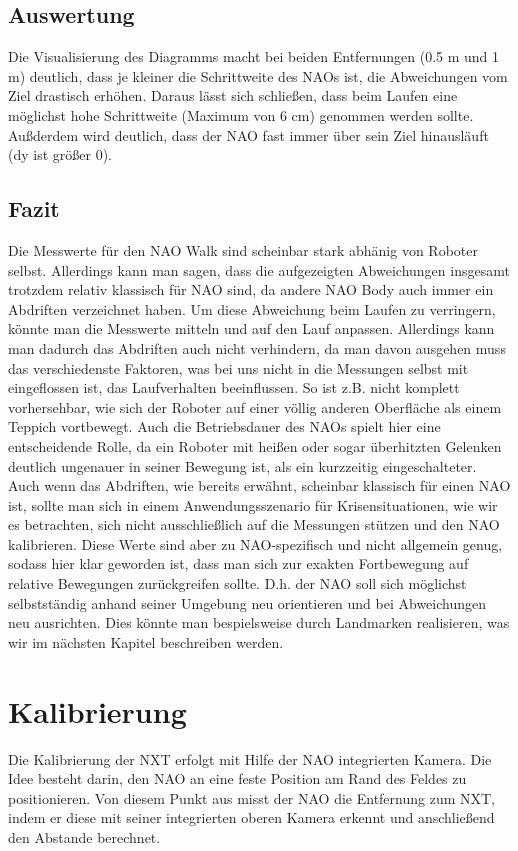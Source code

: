 \subsection{Auswertung}
Die Visualisierung des Diagramms macht bei beiden Entfernungen (0.5 m und 1 m) deutlich, dass je kleiner die Schrittweite des NAOs ist, die Abweichungen vom Ziel drastisch erhöhen. Daraus lässt sich schließen, dass beim Laufen eine möglichst hohe Schrittweite (Maximum von 6 cm) genommen werden sollte.
Außderdem wird deutlich, dass der NAO fast immer über sein Ziel hinausläuft (dy ist größer 0). 

\subsection{Fazit}
Die Messwerte für den NAO Walk sind scheinbar stark abhänig von Roboter selbst. Allerdings kann man sagen, dass die aufgezeigten Abweichungen insgesamt trotzdem relativ klassisch für NAO sind, da andere NAO Body auch immer ein Abdriften verzeichnet haben.
Um diese Abweichung beim Laufen zu verringern, könnte man die Messwerte mitteln und auf den Lauf anpassen. Allerdings kann man dadurch das Abdriften auch nicht verhindern, da man davon ausgehen muss das verschiedenste Faktoren, was bei uns nicht in die Messungen selbst mit eingeflossen ist, das Laufverhalten beeinflussen. So ist z.B. nicht komplett vorhersehbar, wie sich der Roboter auf einer völlig anderen Oberfläche als einem Teppich vortbewegt. Auch die Betriebsdauer des NAOs spielt hier eine entscheidende Rolle, da ein Roboter mit heißen oder sogar überhitzten Gelenken deutlich ungenauer in seiner Bewegung ist, als ein kurzzeitig eingeschalteter.
Auch wenn das Abdriften, wie bereits erwähnt, scheinbar klassisch für einen NAO ist, sollte man sich in einem Anwendungsszenario für Krisensituationen, wie wir es betrachten, sich nicht ausschließlich auf die Messungen stützen und den NAO kalibrieren. Diese Werte sind aber zu NAO-spezifisch und nicht allgemein genug, sodass hier klar geworden ist, dass man sich zur exakten Fortbewegung auf relative Bewegungen zurückgreifen sollte. D.h. der NAO soll sich möglichst selbstständig anhand seiner Umgebung neu orientieren und bei Abweichungen neu ausrichten. Dies könnte man bespielsweise durch Landmarken realisieren, was wir im nächsten Kapitel beschreiben werden.

\section{Kalibrierung}
Die Kalibrierung der NXT erfolgt mit Hilfe der NAO integrierten Kamera. Die Idee besteht darin, den NAO an eine feste Position am Rand des Feldes zu positionieren. Von diesem Punkt aus misst der NAO die Entfernung zum NXT, indem er diese mit seiner integrierten oberen Kamera erkennt und anschließend den Abstande berechnet.

